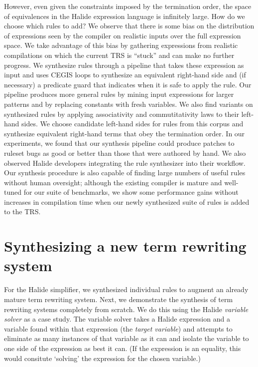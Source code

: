 However, even
given the constraints imposed by the termination order, the space of equivalences 
in the Halide expression language is infinitely large. How do we choose which  
rules to add? We observe that there is some bias on the distribution of expressions 
seen by the compiler on realistic inputs over the full expression space. We take advantage 
of this bias by gathering expressions from realistic compilations on which the current 
TRS is ``stuck'' and can make no further progress. We synthesize rules through a pipeline that takes these expression as input and uses CEGIS loops to synthesize an equivalent right-hand side and (if necessary) a predicate guard that indicates when it is safe to apply 
the rule. Our pipeline produces more general rules by mining input expressions for larger patterns and by replacing constants with fresh variables. We also find variants on synthesized rules by applying associativity and commutitativity laws to their left-hand sides. We choose candidate left-hand sides 
for rules from this corpus and synthesize equivalent right-hand terms that obey the 
termination order. In our experiments, we found that our synthesis pipeline could produce patches to ruleset bugs as good or better than those that were authored by hand. We also observed Halide developers integrating the rule synthesizer into their workflow. Our synthesis procedure is also capable of finding large numbers of useful rules without
human oversight; although the existing compiler is mature 
and well-tuned for our suite of benchmarks, we show some performance 
gains without increases in compilation time when our newly synthesized suite 
of rules is added to the TRS. 

\section{Synthesizing a new term rewriting system}
\label{intro:varsolver}

For the Halide simplifier, we synthesized individual rules to augment an already mature term rewriting system. Next, we demonstrate the synthesis of term rewriting systems completely from scratch. We do this using the Halide \emph{variable solver} as a case study. The variable solver takes a Halide expression and a variable found within that expression (the \emph{target variable}) and attempts to eliminate as many instances of that variable as it can and isolate the variable to one side of the expression as best it can. (If the expression is an equality, this would consitute `solving' the expression for the chosen variable.) 


